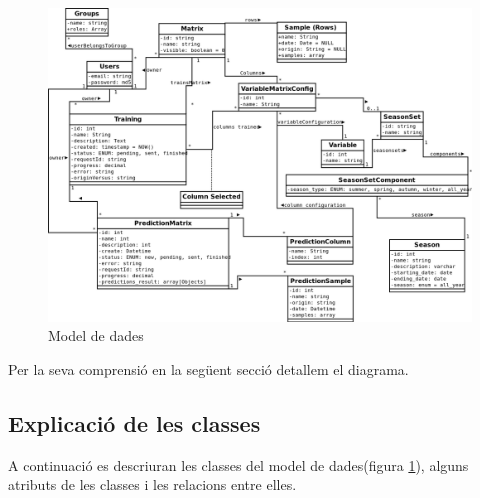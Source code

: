 \begin{figure}
  \includegraphics[scale=0.5]{img/specification/ModelClass.png}
  \caption{Model de dades}
  \label{fig:datamodel}
\end{figure}

Per la seva comprensió en la següent secció detallem el diagrama.


\subsection{Explicaci\'{o} de les classes}
A continuaci\'{o} es descriuran les classes del model de dades(figura \ref{fig:datamodel}), alguns atributs de les classes i les relacions entre elles.

